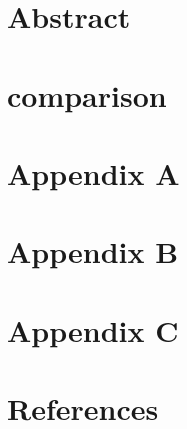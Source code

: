 




\maketitle
\vfill
\section{Abstract}
\newpage
\tableofcontents
\newpage


\newpage

\newpage


\newpage

\newpage

\newpage
\section{comparison}
\newpage
\section{Appendix A}
\newpage
\section{Appendix B}
\newpage
\section{Appendix C}
\newpage
\section{References}

